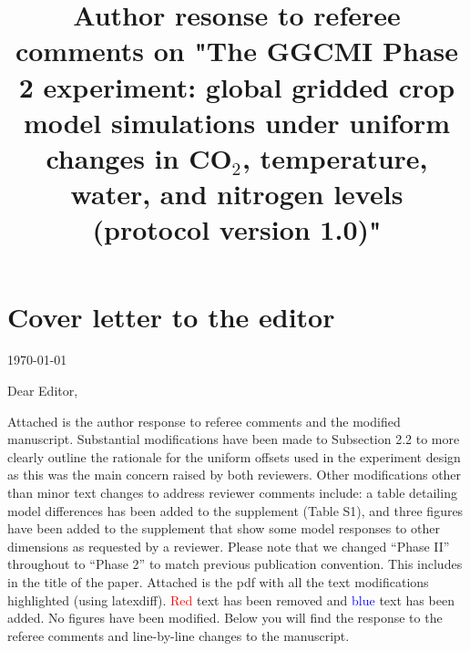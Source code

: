 \documentclass[gmd, manuscript]{copernicus} %
\begin{document}
\title{Author resonse to referee comments on "The GGCMI Phase 2 experiment: global gridded crop model simulations under uniform changes in CO$_2$, temperature, water, and nitrogen levels (protocol version 1.0)"}


\received{}
\pubdiscuss{} %
\revised{}
\accepted{}
\published{}
\maketitle

\section{Cover letter to the editor}

\today
\bigskip

\noindent Dear Editor,

\bigskip
\bigskip

Attached is the author response to referee comments and the modified manuscript.
Substantial modifications have been made to Subsection 2.2 to more clearly outline the rationale for the uniform offsets used in the experiment design as this was the main concern raised by both reviewers.
Other modifications other than minor text changes to address reviewer comments include: a table detailing model differences has been added to the supplement (Table S1), and three figures have been added to the supplement that show some model responses to other dimensions as requested by a reviewer. 
Please note that we changed ``Phase II'' throughout to ``Phase 2'' to match previous publication convention. This includes in the title of the paper.
Attached is the pdf with all the text modifications highlighted (using latexdiff). 
\textcolor{red}{Red} text has been removed and \textcolor{blue}{blue} text has been added. 
No figures have been modified.
Below you will find the response to the referee comments and line-by-line changes to the manuscript.
\end{document}
